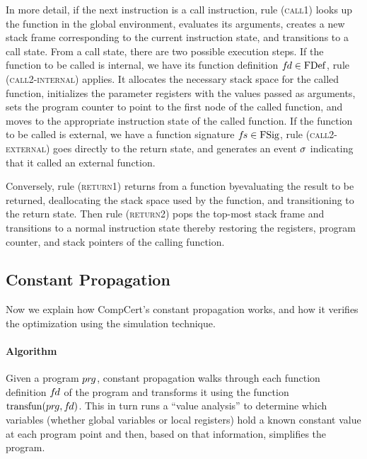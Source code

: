 In more detail, if the next instruction is a call instruction, rule (\textsc{call1}) looks up the
function in the global environment, evaluates its arguments, creates a new stack frame corresponding
to the current instruction state, and transitions to a call state.  From a call state, there are two
possible execution steps.  If the function to be called is internal, \ie we have its function
definition ${f\hspace*{-1pt}d}\in\mathrm{FDef}$, rule (\textsc{call2-internal}) applies.  It allocates the necessary
stack space for the called function, initializes the parameter registers with the values passed as
arguments, sets the program counter to point to the first node of the called function, and moves to
the appropriate instruction state of the called function.  If the function to be called is external,
\ie we have a function signature ${f\hspace*{-1pt}s}\in\mathrm{FSig}$, rule (\textsc{call2-external}) goes directly to
the return state, and generates an event $\sigma$ indicating that it called an external function.

Conversely, rule (\textsc{return1}) returns from a function byevaluating the result to be returned,
deallocating the stack space used by the function, and transitioning to the return state.  Then rule
(\textsc{return2}) pops the top-most stack frame and transitions to a normal instruction state
thereby restoring the registers, program counter, and stack pointers of the calling function.



\subsection{Constant Propagation}
\label{sec:background:constprop}

Now we explain how CompCert's constant propagation works, and how it verifies the optimization using
the simulation technique.

\paragraph{Algorithm}

Given a program ${pr\hspace*{-1pt}g}$, constant propagation walks through each function definition ${f\hspace*{-1pt}d}$ of the program 
and transforms it using the function $\mathrm{transfun}({pr\hspace*{-1pt}g}, {f\hspace*{-1pt}d})$.
This in turn runs a ``value analysis'' to determine which variables (whether global variables or local registers) hold a known constant value at each program point
and then, based on that information, simplifies the program.


